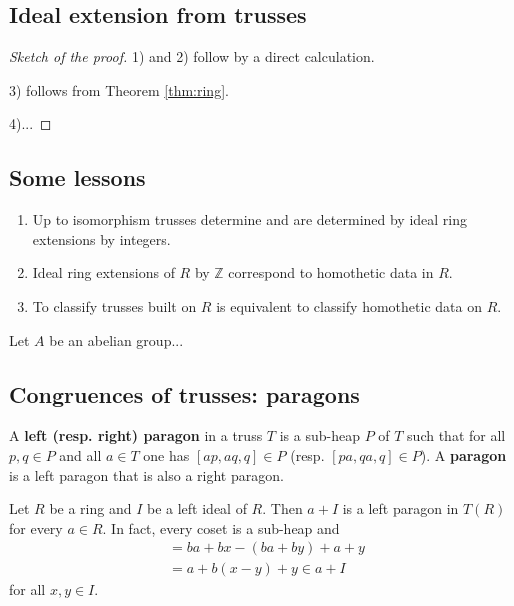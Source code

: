\documentclass{svmult}
\newcommand{\Z}{\mathbb{Z}}
\begin{document}
\subsection{Ideal extension from trusses}

\begin{theorem}

\end{theorem}

\begin{proof}[Sketch of the proof]
    1) and 2) follow by a direct calculation.
    
    3) follows from Theorem \ref{thm:ring}. 
    
    4)...
\end{proof}

\subsection{Some lessons}

\begin{enumerate}
    \item Up to isomorphism trusses determine and are determined by ideal ring
    extensions by integers.
    \item Ideal ring extensions of $R$ by $\Z$ correspond to homothetic data in $R$. 
    \item To classify trusses built on $R$ is equivalent to classify homothetic data on $R$. 
\end{enumerate}

\begin{example}
    Let $A$ be an abelian group...
\end{example}

\subsection{Congruences of trusses: paragons}

\begin{definition}
    A \textbf{left (resp. right) paragon} in a truss $T$ is a sub-heap $P$ of $T$ 
    such that for all $p,q\in P$ and all $a\in T$ 
    one has $[ap,aq,q]\in P$ (resp. $[pa,qa,q]\in P$). A \textbf{paragon} 
    is a left paragon that is also a right paragon. 
\end{definition}

\begin{example}
    Let $R$ be a ring and $I$ be a left ideal of $R$. Then 
    $a+I$ is a left paragon in $T(R)$ for every $a\in R$. In fact, every coset is a sub-heap and
    \begin{align*}
    [b(a+x),b(a+y),a+y]&=ba+bx-(ba+by)+a+y\\
    &=a+b(x-y)+y\in a+I
    \end{align*}
    for all $x,y\in I$. 
\end{example}
\end{document}
